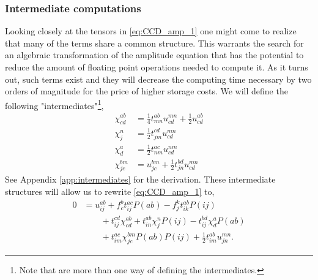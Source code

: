 \documentclass[
    a4paper, aps, twocolumn, floatfix, superscriptaddress,
    nofootinbib]{revtex4-1}
\newcommand{\1}{\mathds{1}}
\begin{document}
        \subsubsection{Intermediate computations}
            Looking closely at the tensors in \autoref{eq:CCD_amp_1} one might
            come to realize that many of the terms share a common structure.
            This warrants the search for an algebraic transformation of the
            amplitude equation that has the potential to reduce the amount of
            floating point operations needed to compute it. As it turns out,
            such terms exist and they will decrease the computing time necessary
            by two orders of magnitude for the price of higher storage costs.
            We will define the following "intermediates"\footnote{Note that are
            more than one way of defining the intermediates.},
            \begin{align}
                \label{eq:intermediate1}
                \chi^{ab}_{cd}
                &= \frac{1}{4}t^{ab}_{mn} u^{mn}_{cd}
                + \frac{1}{2}u^{ab}_{cd} \\
                \label{eq:intermediate2}
                \chi^n_j &= \frac{1}{2}t^{cd}_{jm} u^{mn}_{cd} \\
                \label{eq:intermediate3}
                \chi^a_d &= \frac{1}{2} t^{ac}_{nm} u^{nm}_{cd} \\
                \label{eq:intermediate4}
                \chi^{bm}_{jc}
                &= u^{bm}_{jc} + \frac{1}{2}t^{bd}_{jn}u^{mn}_{cd}
            \end{align}
            See Appendix \ref{app:intermediates} for the derivation.  These
            intermediate structures will allow us to rewrite
            \autoref{eq:CCD_amp_1} to,
            \begin{equation}
                \begin{aligned}
                    0 &= u^{ab}_{ij} + f^b_c t^{ac}_{ij}P(ab)
                    - f^k_jt^{ab}_{ik}P(ij) \\
                    &\qquad
                    + t^{cd}_{ij}\chi^{ab}_{cd} + t^{ab}_{in}\chi^n_jP(ij)
                    - t^{bd}_{ij}\chi^a_dP(ab) \\
                    &\qquad
                    + t^{ac}_{im}\chi^{bm}_{jc}P(ab)P(ij)
                    + \frac{1}{2}t^{ab}_{im}u^{mn}_{jn}.
                \end{aligned}
            \end{equation}
\end{document}
